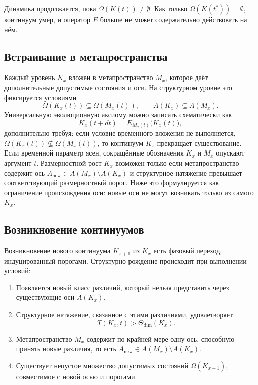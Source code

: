 Динамика продолжается, пока \(\Omega(K(t)) \neq \emptyset\).
Как только \(\Omega(K(t^\ast)) = \emptyset\), континуум умер, и оператор \(E\)
больше не может содержательно действовать на нём.

\subsection{Встраивание в метапространства}

Каждый уровень \(K_x\) вложен в метапространство \(M_x\), которое даёт
дополнительные допустимые состояния и оси.
На структурном уровне это фиксируется условиями
\[
    \Omega(K_x(t)) \subseteq \Omega(M_x(t)), \qquad
    A(K_x) \subseteq A(M_x).
\]
Универсальную эволюционную аксиому можно записать схематически как
\[
    K_x(t+dt) = E_{M_x(t)}\big(K_x(t)\big),
\]
дополнительно требуя: если условие временного вложения не выполняется,
\(\Omega(K_x(t))\not\subseteq\Omega(M_x(t))\), то континуум \(K_x\)
прекращает существование. Если временной параметр ясен, сокращённые обозначения
\(K_x\) и \(M_x\) опускают аргумент \(t\).
Размерностной рост \(K_x\) возможен только если метапространство содержит ось
\(A_{\mathrm{new}}\in A(M_x)\setminus A(K_x)\) и структурное натяжение превышает
соответствующий размерностный порог. Ниже это формулируется как ограничение происхождения
оси: новые оси не могут возникать только из самого \(K_x\).

\subsection{Возникновение континуумов}

Возникновение нового континуума \(K_{x+1}\) из \(K_x\) есть фазовый переход,
индуцированный порогами.
Структурно рождение происходит при выполнении условий:

\begin{enumerate}
    \item Появляется новый класс различий, который нельзя представить через существующие оси \(A(K_x)\).
    \item Структурное натяжение, связанное с этими различиями, удовлетворяет
          \[
              T(K_x,t) > \Theta_{\mathrm{dim}}(K_x).
          \]
    \item Метапространство \(M_x\) содержит по крайней мере одну ось, способную принять новые различия,
          то есть \(A_{\mathrm{new}} \in A(M_x) \setminus A(K_x)\).
    \item Существует непустое множество допустимых состояний \(\Omega(K_{x+1})\), совместимое с новой осью и порогами.
\end{enumerate}

